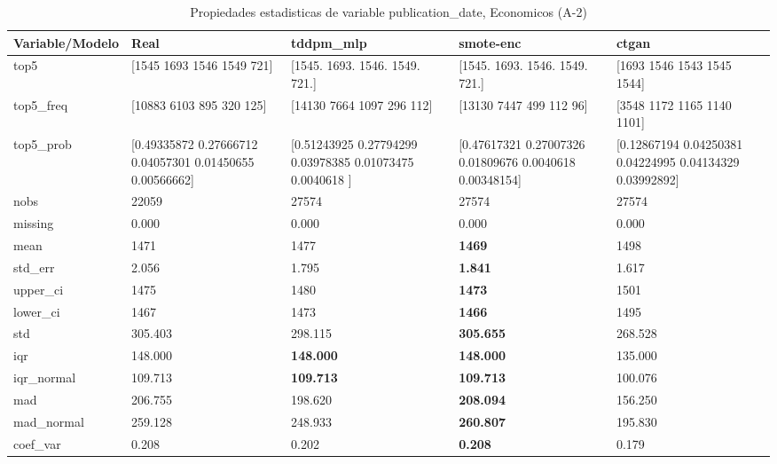 \begin{table}[H]
\centering
\fontsize{8}{14}\selectfont
\caption{Propiedades  estadisticas de variable publication\_date, Economicos (A-2)}
\label{table-stats-economicos-a-2-publication_date}
\begin{tabular}{|l|m{10em}|m{10em}|m{10em}|m{10em}|}
\hline
 \rowcolor[gray]{0.8}
Variable/Modelo & Real & tddpm\_mlp & smote-enc & ctgan \\
\hline top5 & [1545 1693 1546 1549  721] & [1545. 1693. 1546. 1549.  721.] & [1545. 1693. 1546. 1549.  721.] & [1693 1546 1543 1545 1544] \\
\hline top5\_freq & [10883  6103   895   320   125] & [14130  7664  1097   296   112] & [13130  7447   499   112    96] & [3548 1172 1165 1140 1101] \\
\hline top5\_prob & [0.49335872 0.27666712 0.04057301 0.01450655 0.00566662] & [0.51243925 0.27794299 0.03978385 0.01073475 0.0040618 ] & [0.47617321 0.27007326 0.01809676 0.0040618  0.00348154] & [0.12867194 0.04250381 0.04224995 0.04134329 0.03992892] \\
\hline nobs & 22059 & 27574 & 27574 & 27574 \\
\hline missing & 0.000 & 0.000 & 0.000 & 0.000 \\
\hline mean & 1471 & 1477 & \bfseries 1469 & \cellcolor[rgb]{0.9, 0.54, 0.52} 1498 \\
\hline std\_err & 2.056 & 1.795 & \bfseries 1.841 & \cellcolor[rgb]{0.9, 0.54, 0.52} 1.617 \\
\hline upper\_ci & 1475 & 1480 & \bfseries 1473 & \cellcolor[rgb]{0.9, 0.54, 0.52} 1501 \\
\hline lower\_ci & 1467 & 1473 & \bfseries 1466 & \cellcolor[rgb]{0.9, 0.54, 0.52} 1495 \\
\hline std & 305.403 & 298.115 & \bfseries 305.655 & \cellcolor[rgb]{0.9, 0.54, 0.52} 268.528 \\
\hline iqr & 148.000 & \bfseries 148.000 & \bfseries 148.000 & \cellcolor[rgb]{0.9, 0.54, 0.52} 135.000 \\
\hline iqr\_normal & 109.713 & \bfseries 109.713 & \bfseries 109.713 & \cellcolor[rgb]{0.9, 0.54, 0.52} 100.076 \\
\hline mad & 206.755 & 198.620 & \bfseries 208.094 & \cellcolor[rgb]{0.9, 0.54, 0.52} 156.250 \\
\hline mad\_normal & 259.128 & 248.933 & \bfseries 260.807 & \cellcolor[rgb]{0.9, 0.54, 0.52} 195.830 \\
\hline coef\_var & 0.208 & 0.202 & \bfseries 0.208 & \cellcolor[rgb]{0.9, 0.54, 0.52} 0.179 \\

\end{tabular}
\end{table}
